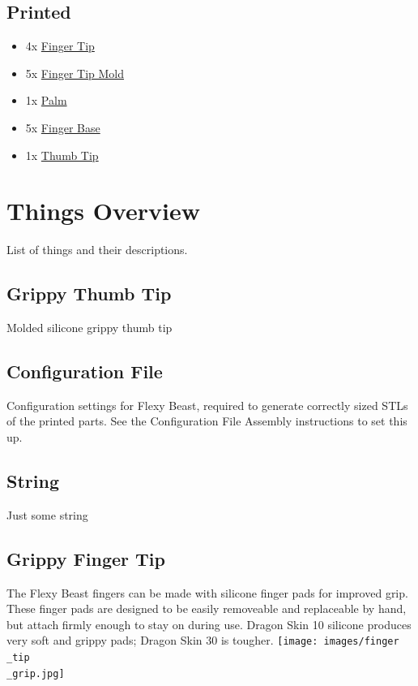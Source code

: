 \documentclass[11pt]{article}
\begin{document}
\subsection{Printed}
\begin{itemize}
\item 4x \hyperlink{thing_finger\_tip}{Finger Tip}
\item 5x \hyperlink{thing_finger\_tip\_mold}{Finger Tip Mold}
\item 1x \hyperlink{thing_palm}{Palm}
\item 5x \hyperlink{thing_finger\_base}{Finger Base}
\item 1x \hyperlink{thing_thumb\_tip}{Thumb Tip}
\end{itemize}

\newpage

\section{Things Overview}
List of things and their descriptions.

\hypertarget{thing_thumb\_tip\_grip}{\subsection{Grippy Thumb Tip}}
Molded silicone grippy thumb tip

\hypertarget{thing_config\_file}{\subsection{Configuration File}}
Configuration settings for Flexy Beast, required to generate correctly sized STLs of the printed parts. See the Configuration File Assembly instructions to set this up.

\hypertarget{thing_string}{\subsection{String}}
Just some string

\hypertarget{thing_finger\_tip\_grip}{\subsection{Grippy Finger Tip}}
The Flexy Beast fingers can be made with silicone finger pads for improved grip. These finger pads are designed to be easily removeable and replaceable by hand, but attach firmly enough to stay on during use. Dragon Skin 10 silicone produces very soft and grippy pads; Dragon Skin 30 is tougher.
\texttt{[image: images/finger\\\_tip\\\_grip.jpg]}
\end{document}
